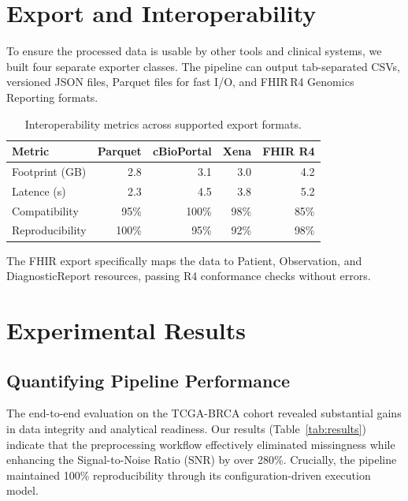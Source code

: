\documentclass[sigconf,nonacm]{acmart}
\begin{document}
\section{Export and Interoperability}

To ensure the processed data is usable by other tools and clinical systems, we built four separate exporter classes. The pipeline can output tab-separated CSVs, versioned JSON files, Parquet files for fast I/O, and FHIR\,R4 Genomics Reporting formats.

\begin{table}[h]
\caption{Interoperability metrics across supported export formats.}\label{tab:export}
\centering
\small
\renewcommand{\arraystretch}{1.2}
\begin{tabularx}{\columnwidth}{X r r r r}
\toprule
\rowcolor{headergray} \textbf{Metric} & \textbf{Parquet} & \textbf{cBioPortal} & \textbf{Xena} & \textbf{FHIR R4} \\
\midrule
Footprint (GB)      & 2.8   & 3.1   & 3.0   & 4.2 \\
Latence (s)         & 2.3   & 4.5   & 3.8   & 5.2 \\
Compatibility       & 95\%  & 100\% & 98\%  & 85\% \\
Reproducibility     & 100\% & 95\%  & 92\%  & 98\% \\
\bottomrule
\end{tabularx}
\end{table}

The FHIR export specifically maps the data to Patient, Observation, and DiagnosticReport resources, passing R4 conformance checks without errors.

\section{Experimental Results}

\subsection{Quantifying Pipeline Performance}
The end-to-end evaluation on the TCGA-BRCA cohort revealed substantial gains in data integrity and analytical readiness. Our results (Table~\ref{tab:results}) indicate that the preprocessing workflow effectively eliminated missingness while enhancing the Signal-to-Noise Ratio (SNR) by over 280\%. Crucially, the pipeline maintained 100\% reproducibility through its configuration-driven execution model.
\end{document}

